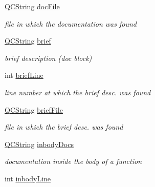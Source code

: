 \begin{DoxyCompactItemize}
\mbox{\hyperlink{class_q_c_string}{Q\+C\+String}} \mbox{\hyperlink{class_entry_ac6841c6ec8fd7ae6121364e7e1895e94}{doc\+File}}
\begin{DoxyCompactList}\small\item\em file in which the documentation was found \end{DoxyCompactList}\item 
\mbox{\label{class_entry_ad602ba19af5785515ed81790d843ce4c}} 
\mbox{\hyperlink{class_q_c_string}{Q\+C\+String}} \mbox{\hyperlink{class_entry_ad602ba19af5785515ed81790d843ce4c}{brief}}
\begin{DoxyCompactList}\small\item\em brief description (doc block) \end{DoxyCompactList}\item 
\mbox{\label{class_entry_add7a19978ab2b30a9755b8d5e3cbd00a}} 
int \mbox{\hyperlink{class_entry_add7a19978ab2b30a9755b8d5e3cbd00a}{brief\+Line}}
\begin{DoxyCompactList}\small\item\em line number at which the brief desc. was found \end{DoxyCompactList}\item 
\mbox{\label{class_entry_a9a0b7ed65e6082088ededf633771d3d1}} 
\mbox{\hyperlink{class_q_c_string}{Q\+C\+String}} \mbox{\hyperlink{class_entry_a9a0b7ed65e6082088ededf633771d3d1}{brief\+File}}
\begin{DoxyCompactList}\small\item\em file in which the brief desc. was found \end{DoxyCompactList}\item 
\mbox{\label{class_entry_a51e209dbd21d11b0c63d246efa6182f2}} 
\mbox{\hyperlink{class_q_c_string}{Q\+C\+String}} \mbox{\hyperlink{class_entry_a51e209dbd21d11b0c63d246efa6182f2}{inbody\+Docs}}
\begin{DoxyCompactList}\small\item\em documentation inside the body of a function \end{DoxyCompactList}\item 
\mbox{\label{class_entry_a8eed853bf654e1d583e10f04062ccdde}} 
int \mbox{\hyperlink{class_entry_a8eed853bf654e1d583e10f04062ccdde}{inbody\+Line}}

\end{DoxyCompactItemize}
